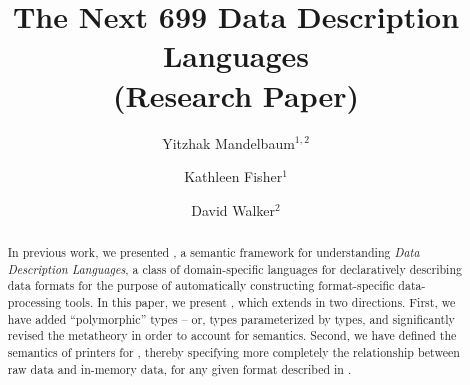\documentclass[tfpsymp,ams,pagenumbers]{tfp05symp}
\begin{document}
\title{The Next 699 Data Description Languages\\(Research Paper)}
\author{Yitzhak Mandelbaum$^{1,2}$ \and Kathleen Fisher$^1$ \and David Walker$^2$}



\maketitle{}

\begin{abstract}  


  In previous work, we presented \ddcold{}, a semantic framework for
  understanding {\em Data Description Languages}, a class of
  domain-specific languages for declaratively describing data formats
  for the purpose of automatically constructing format-specific
  data-processing tools. In this paper, we present \ddc{}, which
  extends \ddcold{} in two directions. First, we have added
  ``polymorphic'' types -- or, types parameterized by types, and
  significantly revised the metatheory in order to account for
  semantics. Second, we have defined the semantics of printers
  for \ddc{}, thereby specifying more completely the relationship
  between raw data and in-memory data, for any given format described
  in \ddc{}.
\end{abstract}











% 
% 

%

%
\end{document}
